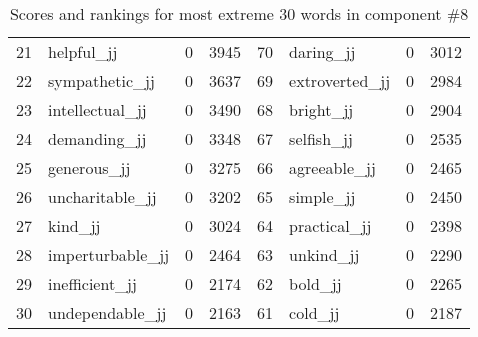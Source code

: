 \begin{table}[tbp]
\begin{tabular}{| rlr@{.}l | rlr@{.}l |}
    21 & helpful\_jj & 0 & 3945    &    70 & daring\_jj & 0 & 3012 \\
    22 & sympathetic\_jj & 0 & 3637    &    69 & extroverted\_jj & 0 & 2984 \\
    23 & intellectual\_jj & 0 & 3490    &    68 & bright\_jj & 0 & 2904 \\
    24 & demanding\_jj & 0 & 3348    &    67 & selfish\_jj & 0 & 2535 \\
    25 & generous\_jj & 0 & 3275    &    66 & agreeable\_jj & 0 & 2465 \\
    26 & uncharitable\_jj & 0 & 3202    &    65 & simple\_jj & 0 & 2450 \\
    27 & kind\_jj & 0 & 3024    &    64 & practical\_jj & 0 & 2398 \\
    28 & imperturbable\_jj & 0 & 2464    &    63 & unkind\_jj & 0 & 2290 \\
    29 & inefficient\_jj & 0 & 2174    &    62 & bold\_jj & 0 & 2265 \\
    30 & undependable\_jj & 0 & 2163    &    61 & cold\_jj & 0 & 2187 \\
    \hline
    \end{tabular}
    \caption{Scores and rankings for most extreme 30 words in component \#8} 
\end{table}
\clearpage
